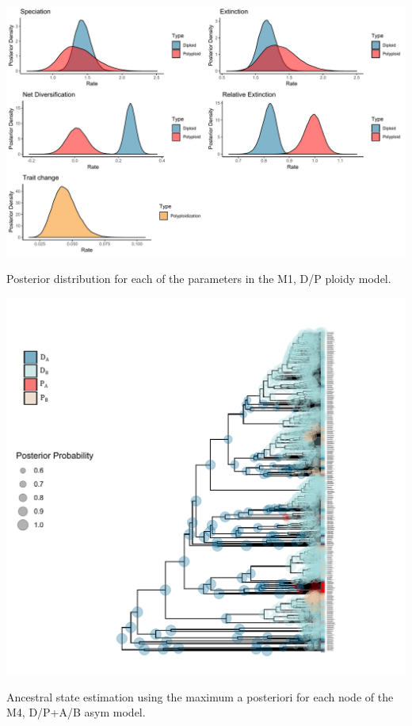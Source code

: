 \begin{suppfigure}
\includegraphics[width=\textwidth]{bisseDPnodipposteriordist.pdf}
\caption{Posterior distribution for each of the parameters in the M1, D/P ploidy model.} %
\label{suppfigure:DPnodip}
\end{suppfigure}

\begin{suppfigure}
\includegraphics[width=\textwidth]{asrDPAB.pdf}
\caption{Ancestral state estimation using the maximum a posteriori for each node of the M4, D/P+A/B asym model.} %
\label{suppfigure:DPnodipABasr}
\end{suppfigure}

